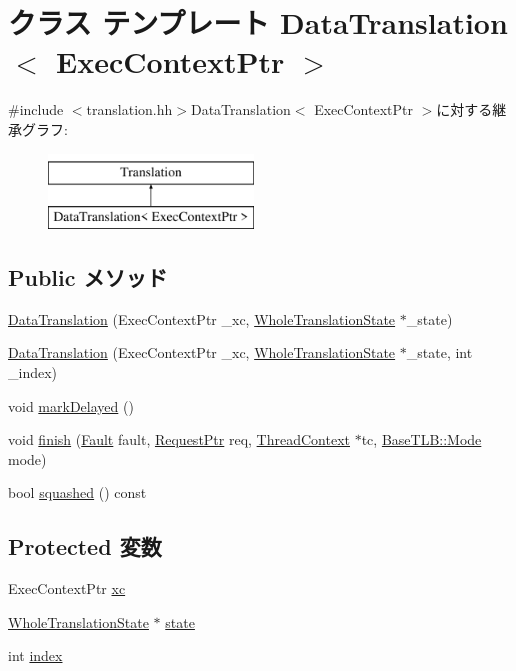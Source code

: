 \hypertarget{classDataTranslation}{
\section{クラス テンプレート DataTranslation$<$ ExecContextPtr $>$}
\label{classDataTranslation}
}


{\ttfamily \#include $<$translation.hh$>$}DataTranslation$<$ ExecContextPtr $>$に対する継承グラフ:\begin{figure}[H]
\begin{center}
\leavevmode
\includegraphics[height=2cm]{classDataTranslation}
\end{center}
\end{figure}
\subsection*{Public メソッド}
\begin{DoxyCompactItemize}
\item 
\hyperlink{classDataTranslation_aa814ed9c851686410c9efd4a3d8c2d53}{DataTranslation} (ExecContextPtr \_\-xc, \hyperlink{classWholeTranslationState}{WholeTranslationState} $\ast$\_\-state)
\item 
\hyperlink{classDataTranslation_ae8650a15b755aa7c69728323de568c2c}{DataTranslation} (ExecContextPtr \_\-xc, \hyperlink{classWholeTranslationState}{WholeTranslationState} $\ast$\_\-state, int \_\-index)
\item 
void \hyperlink{classDataTranslation_ad1fd11d1e352cfc4b329d29b46a19fc4}{markDelayed} ()
\item 
void \hyperlink{classDataTranslation_a01e7d945def8d2e5df87a169954fa89f}{finish} (\hyperlink{classRefCountingPtr}{Fault} fault, \hyperlink{classRequest}{RequestPtr} req, \hyperlink{classThreadContext}{ThreadContext} $\ast$tc, \hyperlink{classBaseTLB_a46c8a310cf4c094f8c80e1cb8dc1f911}{BaseTLB::Mode} mode)
\item 
bool \hyperlink{classDataTranslation_af355b62f22559090d6e3047bdf83f24f}{squashed} () const 
\end{DoxyCompactItemize}
\subsection*{Protected 変数}
\begin{DoxyCompactItemize}
\item 
ExecContextPtr \hyperlink{classDataTranslation_a5a1319d106e664e08fe03cc819c9354d}{xc}
\item 
\hyperlink{classWholeTranslationState}{WholeTranslationState} $\ast$ \hyperlink{classDataTranslation_a70366c1ef6f173eb70265992cf6495bf}{state}
\item 
int \hyperlink{classDataTranslation_a750b5d744c39a06bfb13e6eb010e35d0}{index}
\end{DoxyCompactItemize}


